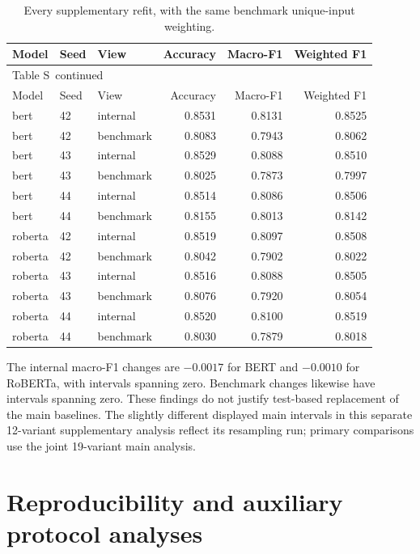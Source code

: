 \documentclass[10pt,a4paper]{article}
\renewcommand{\thetable}{S\arabic{table}}
\begin{document}
{\small
\setlength{\tabcolsep}{4pt}
\begin{longtable}{@{}lllrrr@{}}
\caption{Every supplementary refit, with the same benchmark unique-input weighting.}\label{sup:ref14-seeds}\\
\toprule
Model & Seed & View & Accuracy & Macro-F1 & Weighted F1 \\
\midrule\endfirsthead
\multicolumn{6}{l}{\small Table \thetable\ continued}\\
\toprule
Model & Seed & View & Accuracy & Macro-F1 & Weighted F1 \\
\midrule\endhead
\bottomrule\endfoot
bert & 42 & internal & 0.8531 & 0.8131 & 0.8525 \\
bert & 42 & benchmark & 0.8083 & 0.7943 & 0.8062 \\
bert & 43 & internal & 0.8529 & 0.8088 & 0.8510 \\
bert & 43 & benchmark & 0.8025 & 0.7873 & 0.7997 \\
bert & 44 & internal & 0.8514 & 0.8086 & 0.8506 \\
bert & 44 & benchmark & 0.8155 & 0.8013 & 0.8142 \\
roberta & 42 & internal & 0.8519 & 0.8097 & 0.8508 \\
roberta & 42 & benchmark & 0.8042 & 0.7902 & 0.8022 \\
roberta & 43 & internal & 0.8516 & 0.8088 & 0.8505 \\
roberta & 43 & benchmark & 0.8076 & 0.7920 & 0.8054 \\
roberta & 44 & internal & 0.8520 & 0.8100 & 0.8519 \\
roberta & 44 & benchmark & 0.8030 & 0.7879 & 0.8018 \\
\end{longtable}
}

The internal macro-F1 changes are $-0.0017$ for BERT and $-0.0010$ for RoBERTa, with intervals spanning zero. Benchmark changes likewise have intervals spanning zero. These findings do not justify test-based replacement of the main baselines. The slightly different displayed main intervals in this separate 12-variant supplementary analysis reflect its resampling run; primary comparisons use the joint 19-variant main analysis.


\section{Reproducibility and auxiliary protocol analyses}\label{sup:reproducibility}
\end{document}
